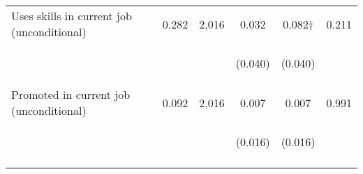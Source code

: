 \begin{tabular}{lccccc}
\noalign{\smallskip}Uses skills in current job (unconditional) & 0.282 & 2,016 & 0.032 & 0.082† & 0.211\\
 & \begin{footnotesize}\end{footnotesize} & \begin{footnotesize}\end{footnotesize} & \begin{footnotesize}(0.040)\end{footnotesize} & \begin{footnotesize}(0.040)\end{footnotesize} & \begin{footnotesize}\end{footnotesize}\\
\noalign{\smallskip}Promoted in current job (unconditional) & 0.092 & 2,016 & 0.007 & 0.007 & 0.991\\
 & \begin{footnotesize}\end{footnotesize} & \begin{footnotesize}\end{footnotesize} & \begin{footnotesize}(0.016)\end{footnotesize} & \begin{footnotesize}(0.016)\end{footnotesize} & \begin{footnotesize}\end{footnotesize}\\
\noalign{\smallskip}\hline\end{tabular}\\
